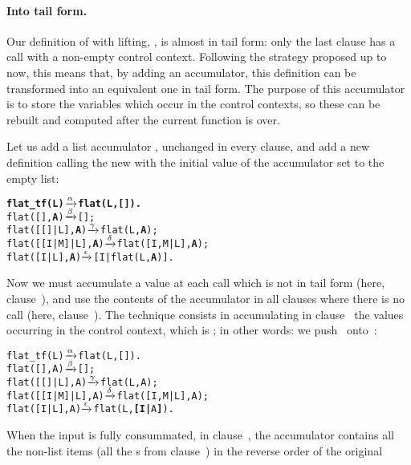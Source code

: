\medskip

\paragraph{Into tail form.}

Our definition of  with lifting,
,  is almost in
tail form: only the last clause has a call with a non\hyp{}empty
control context. Following the strategy proposed up to now, this means
that, by adding an accumulator, this definition can be transformed
into an equivalent one in tail form. The purpose of this accumulator
is to store the variables which occur in the control contexts, so
these can be rebuilt and computed after the current function is over.

Let us add a list accumulator , unchanged in every clause,
and add a new  definition calling the new
 with the initial value of the accumulator set to the
empty list:
\begin{alltt}
\textbf{flat_tf(L)        \(\smashedrightarrow{\alpha}\) flat(L,[]).}
flat(       [],\textbf{A}) \(\smashedrightarrow{\beta}\) [];\hfill% A \emph{unused yet}
flat(   [[]|L],\textbf{A}) \(\smashedrightarrow{\gamma}\) flat(L,\textbf{A});
flat([[I|M]|L],\textbf{A}) \(\smashedrightarrow{\delta}\) flat([I,M|L],\textbf{A});
flat(    [I|L],\textbf{A}) \(\smashedrightarrow{\epsilon}\) [I|flat(L,\textbf{A})].
\end{alltt}
Now we must accumulate a value at each call which is not in tail form
(here, clause~\clause{\epsilon}), and use the contents of the
accumulator in all clauses where there is no call (here,
clause~\clause{\alpha}). The technique consists in accumulating in
clause~\clause{\epsilon} the values occurring in the control context,
which is \erlcode{[I|\textvisiblespace]}; in other words: we
push~ onto~:
\begin{alltt}
flat_tf(L)        \(\smashedrightarrow{\alpha}\) flat(L,[]).
flat(       [],A) \(\smashedrightarrow{\beta}\) [];\hfill% A \emph{unused yet}
flat(   [[]|L],A) \(\smashedrightarrow{\gamma}\) flat(L,A);
flat([[I|M]|L],A) \(\smashedrightarrow{\delta}\) flat([I,M|L],A);
flat(    [I|L],A) \(\smashedrightarrow{\epsilon}\) flat(L,\textbf{[I|}A\textbf{]}).
\end{alltt}
When the input is fully consummated, in clause~\clause{\beta}, the
accumulator contains all the non\hyp{}list items (all the s
from clause~\clause{\epsilon}) in the reverse order of the original
